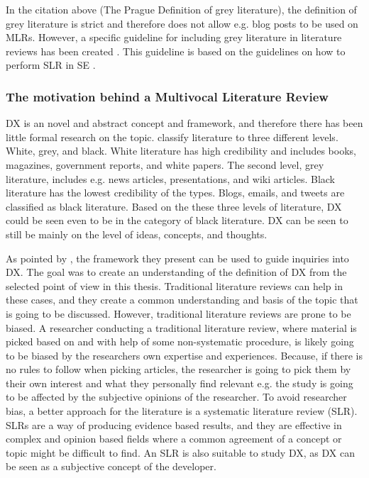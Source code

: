 \documentclass[english, 12pt, a4paper, sci, utf8, a-1b, online]{aaltothesis}
\begin{document}
In the citation above (The Prague Definition of grey literature), the definition of grey literature is strict and therefore does not allow e.g. blog posts to be used on MLRs. However, a specific guideline for including grey literature in literature reviews has been created \parencite{guidelines-for-MLR}. This guideline is based on the guidelines on how to perform SLR in SE \parencite{guidelines-for-SLR-in-SE}.

\subsubsection{The motivation behind a Multivocal Literature Review}

DX is an novel and abstract concept and framework, and therefore there has been little formal research on the topic. \textcite{guidelines-for-MLR} classify literature to three different levels. White, grey, and black. White literature has high credibility and includes books, magazines, government reports, and white papers. The second level, grey literature, includes e.g. news articles, presentations, and wiki articles. Black literature has the lowest credibility of the types. Blogs, emails, and tweets are classified as black literature. Based on the these three levels of literature, DX could be seen even to be in the category of black literature. DX can be seen to still be mainly on the level of ideas, concepts, and thoughts.

As pointed by \textcite{fagerholm-doctoral-thesis}, the framework they present can be used to guide inquiries into DX. The goal was to create an understanding of the definition of DX from the selected point of view in this thesis. Traditional literature reviews can help in these cases, and they create a common understanding and basis of the topic that is going to be discussed. However, traditional literature reviews are prone to be biased. A researcher conducting a traditional literature review, where material is picked based on and with help of some non-systematic procedure, is likely going to be biased by the researchers own expertise and experiences. Because, if there is no rules to follow when picking articles, the researcher is going to pick them by their own interest and what they personally find relevant e.g. the study is going to be affected by the subjective opinions of the researcher. To avoid researcher bias, a better approach for the literature is a systematic literature review (SLR). SLRs are a way of producing evidence based results, and they are effective in complex and opinion based fields where a common agreement of a concept or topic might be difficult to find. An SLR is also suitable to study DX, as DX can be seen as a subjective concept of the developer.
\end{document}

